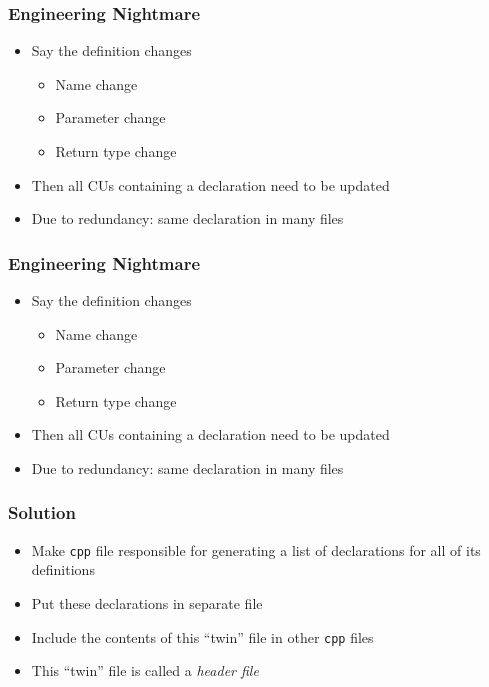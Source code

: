 \documentclass{../ucll-slides}
\begin{document}
\begin{frame}
  \frametitle{Engineering Nightmare}
  \begin{itemize}
    \item Say the definition changes
          \begin{itemize}
            \item Name change
            \item Parameter change
            \item Return type change
          \end{itemize}
    \item Then all CUs containing a declaration need to be updated
    \item Due to redundancy: same declaration in many files
  \end{itemize}
\end{frame}

\begin{frame}
  \frametitle{Engineering Nightmare}
  \begin{itemize}
    \item Say the definition changes
          \begin{itemize}
            \item Name change
            \item Parameter change
            \item Return type change
          \end{itemize}
    \item Then all CUs containing a declaration need to be updated
    \item Due to redundancy: same declaration in many files
  \end{itemize}
\end{frame}

\begin{frame}
  \frametitle{Solution}
  \begin{itemize}
    \item Make {\tt cpp} file responsible for generating a list of declarations
          for all of its definitions
    \item Put these declarations in separate file
    \item Include the contents of this ``twin'' file in other {\tt cpp} files
    \item This ``twin'' file is called a \emph{header file}
  \end{itemize}
\end{frame}
\end{document}
